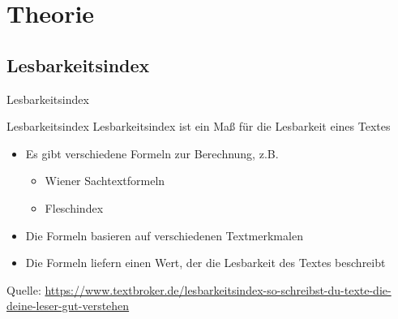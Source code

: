 \documentclass[
	aspectratio=169, %
	8pt, %
]{beamer}
\subtitle{Präsentation für die Veranstaltung Fachdidaktik Physik 3}
\date{07.02.2025}
\begin{document}

\section{Theorie}

\subsection{Lesbarkeitsindex}

\begin{frame}[fragile]{Lesbarkeitsindex}

	\begin{definition}{Lesbarkeitsindex}
	Lesbarkeitsindex ist ein Maß für die Lesbarkeit eines Textes
		\begin{itemize}
			\item Es gibt verschiedene Formeln zur Berechnung, z.B.
			\begin{itemize}
				\item Wiener Sachtextformeln
				\item Fleschindex
			\end{itemize}
			\item Die Formeln basieren auf verschiedenen Textmerkmalen
			\item Die Formeln liefern einen Wert, der die Lesbarkeit des Textes beschreibt
		\end{itemize}
	\end{definition}
	{\tiny Quelle: \url{https://www.textbroker.de/lesbarkeitsindex-so-schreibst-du-texte-die-deine-leser-gut-verstehen}}
\end{frame}
\end{document}
